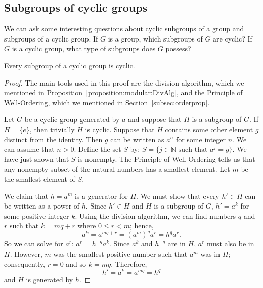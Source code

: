 


  
\subsection{Subgroups of cyclic groups}
 
 
We can ask some interesting questions about cyclic subgroups of a
group and subgroups of a cyclic group.  If $G$ is a group, which
subgroups of $G$ are cyclic? If $G$ is a cyclic group, what type of
subgroups does $G$ possess? 
 
 
 
\begin{prop}{}
Every subgroup of a cyclic group is cyclic.
\end{prop}
 
 
\begin{proof}
The main tools used in this proof are the division algorithm, which we mentioned in Proposition~\ref{proposition:modular:DivAlg},  and the
Principle of Well-Ordering, which we mentioned in Section~\ref{subsec:orderprop}.
 
Let $G$ be a cyclic group generated by $a$
and suppose that $H$ is a subgroup of $G$. If $H = \{ e \}$, then
trivially $H$ is cyclic. Suppose that $H$ contains some other element
$g$ distinct from the identity. Then $g$ can be written as
$a^n$ for some integer $n$. We can assume that $n > 0$.  
 Define the set $S$ by:  $S = \{j \in \mathbb{N} \text{ such that } a^j=g\}$. We have just shown that $S$ is nonempty. The Principle of Well-Ordering tells us that any nonempty subset of the natural numbers has  a smallest element.  Let $m$ be the smallest element of $S$.

We claim that $h = a^m$ is a generator for $H$.  We must show that
every $h' \in H$ can be written as a power of $h$. Since $h' \in H$
and $H$ is a subgroup of $G$, $h' = a^k$ for some positive integer
$k$. Using the division algorithm, we can find numbers $q$ and $r$
such that $k = mq +r$ where $0 \leq r < m$; hence,
\[
a^k = a^{mq +r} = (a^m)^q a^r = h^q a^r.
\]
So we can solve for $a^r$:  $a^r =h^{-q}  a^k $. Since $a^k$ and $h^{-q}$ are in $H$, $a^r$ must
also be in $H$.  However, $m$ was the smallest positive number such that
$a^m$ was in $H$; consequently, $r=0$ and so $k=mq$. Therefore, 
\[
h' = a^k = a^{mq} =  h^q
\]
and $H$ is generated by $h$.
\end{proof}
 
